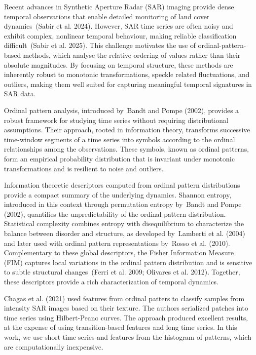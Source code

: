 \documentclass[
  conference]{IEEEtran}
\begin{document}
Recent advances in Synthetic Aperture Radar (SAR) imaging provide dense
temporal observations that enable detailed monitoring of land cover
dynamics~(Sabir et al. 2024). However, SAR time series are often noisy
and exhibit complex, nonlinear temporal behaviour, making reliable
classification difficult~(Sabir et al. 2025). This challenge motivates
the use of ordinal-pattern-based methods, which analyse the relative
ordering of values rather than their absolute magnitudes. By focusing on
temporal structure, these methods are inherently robust to monotonic
transformations, speckle related fluctuations, and outliers, making them
well suited for capturing meaningful temporal signatures in SAR data.

Ordinal pattern analysis, introduced by~Bandt and Pompe (2002), provides
a robust framework for studying time series without requiring
distributional assumptions. Their approach, rooted in information
theory, transforms successive time-window segments of a time series into
symbols according to the ordinal relationships among the observations.
These symbols, known as ordinal patterns, form an empirical probability
distribution that is invariant under monotonic transformations and is
resilient to noise and outliers.

Information theoretic descriptors computed from ordinal pattern
distributions provide a compact summary of the underlying dynamics.
Shannon entropy, introduced in this context through permutation entropy
by~Bandt and Pompe (2002), quantifies the unpredictability of the
ordinal pattern distribution. Statistical complexity combines entropy
with disequilibrium to characterize the balance between disorder and
structure, as developed by~Lamberti et al. (2004) and later used with
ordinal pattern representations by~Rosso et al. (2010). Complementary to
these global descriptors, the Fisher Information Measure (FIM) captures
local variations in the ordinal pattern distribution and is sensitive to
subtle structural changes~(Ferri et al. 2009; Olivares et al. 2012).
Together, these descriptors provide a rich characterization of temporal
dynamics.

Chagas et al. (2021) used features from ordinal patters to classify
samples from intensity SAR images based on their texture. The authors
serialized patches into time series using Hilbert-Peano curves. The
approach produced excellent results, at the expense of using
transition-based features and long time series. In this work, we use
short time series and features from the histogram of patterns, which are
computationally inexpensive.
\end{document}
